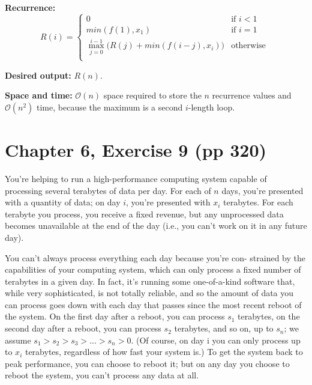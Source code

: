 \documentclass[12pt, letterpaper]{article}
\begin{document}
\vspace{5mm}
\noindent\textbf{Recurrence:}
\begin{equation*}
    R(i) = 
    \begin{cases}
    0 & \text{if } i < 1 \\
    min(f(1), x_1) & \text{if } i = 1 \\
    \max\limits_{j=0}^{i-1} \big( R(j) + min(f(i-j), x_i) \big) & \text{otherwise } \\
    \end{cases}
\end{equation*}

\vspace{5mm}
\noindent\textbf{Desired output:}
$R(n)$.

\vspace{5mm}
\noindent\textbf{Space and time:}
$\mathcal{O}(n)$ space required to store the $n$ recurrence values and $\mathcal{O}(n^2)$ time, because the maximum is a second $i$-length loop.



\clearpage

\section{Chapter 6, Exercise 9 (pp 320)}
You're helping to run a high-performance computing system capable of processing several terabytes of data per day. 
For each of $n$ days, you're presented with a quantity of data; on day $i$, you're presented with $x_i$ terabytes. 
For each terabyte you process, you receive a fixed revenue, but any unprocessed data becomes unavailable at the end of the day (i.e., you can't work on it in any future day).

You can't always process everything each day because you're con- strained by the capabilities of your computing system, which can only process a fixed number of terabytes in a given day. 
In fact, it's running some one-of-a-kind software that, while very sophisticated, is not totally reliable, and so the amount of data you can process goes down with each day that passes since the most recent reboot of the system. 
On the first day after a reboot, you can process $s_1$ terabytes, on the second day after a reboot, you can process $s_2$ terabytes, and so on, up to $s_n$; 
we assume $s_1 > s_2 > s_3 > ... > s_n > 0$. (Of course, on day i you can only process up to $x_i$ terabytes, regardless of how fast your system is.) 
To get the system back to peak performance, you can choose to reboot it; but on any day you choose to reboot the system, you can't process any data at all.
\end{document}
